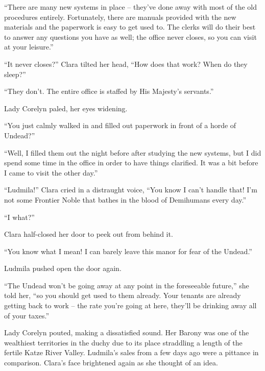 

“There are many new systems in place – they’ve done away with most of the old procedures entirely. Fortunately, there are manuals provided with the new materials and the paperwork is easy to get used to. The clerks will do their best to answer any questions you have as well; the office never closes, so you can visit at your leisure.”

 

“It never closes?” Clara tilted her head, “How does that work? When do they sleep?”

 

“They don’t. The entire office is staffed by His Majesty’s servants.”

 

Lady Corelyn paled, her eyes widening.

 

“You just calmly walked in and filled out paperwork in front of a horde of Undead?”

 

“Well, I filled them out the night before after studying the new systems, but I did spend some time in the office in order to have things clarified. It was a bit before I came to visit the other day.”

 

“Ludmila!” Clara cried in a distraught voice, “You know I can’t handle that! I’m not some Frontier Noble that bathes in the blood of Demihumans every day.”

 

“I what?”

 

Clara half-closed her door to peek out from behind it.

 

“You know what I mean! I can barely leave this manor for fear of the Undead.”

 

Ludmila pushed open the door again.

 

“The Undead won’t be going away at any point in the foreseeable future,” she told her, “so you should get used to them already. Your tenants are already getting back to work – the rate you’re going at here, they’ll be drinking away all of your taxes.”

 

Lady Corelyn pouted, making a dissatisfied sound. Her Barony was one of the wealthiest territories in the duchy due to its place straddling a length of the fertile Katze River Valley. Ludmila’s sales from a few days ago were a pittance in comparison. Clara’s face brightened again as she thought of an idea.

